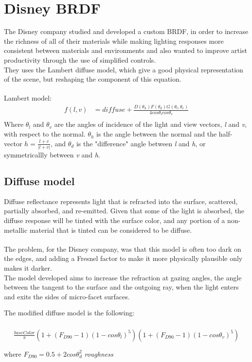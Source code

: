 \documentclass[11pt]{article}
\begin{document}
\section{Disney BRDF}
The Disney company studied and developed a custom BRDF, in order to increase the
richness of all of their materials while making lighting responses more consistent between materials and
environments and also wanted to improve artist productivity through the use of simplified controls.\\
They uses the Lambert diffuse model, which give a good physical representation of the scene, but reshaping the component of this equation.\\\\
Lambert model: 
\begin{align*}
 f(l,v) &= diffuse + \frac{D(\theta_h)F(\theta_d)G(\theta_l,\theta_v)}{4cos\theta_lcos\theta_v}\\
\end{align*}
Where $\theta_l$ and $\theta_v$ are the angles of incidence of the light and view vectors, \textit{l} and \textit{v}, with respect to the normal.
$\theta_h$ is the angle between the normal and the half-vector $h = \frac{l+v}{|l+v|} $, and $\theta_d$ is the "difference" angle between \textit{l} and \textit{h}, or symmetricallly between \textit{v} and \textit{h}.

\subsection{Diffuse model}
Diffuse reflectance represents light that is refracted into the surface, scattered, partially absorbed,
and re-emitted. Given that some of the light is absorbed, the diffuse response will be tinted with the
surface color, and any portion of a non-metallic material that is tinted can be considered to be diffuse.\\\\
The problem, for the Disney company, was that this model is often too dark on the edges, and adding a Fresnel factor to make it more physically plausible only makes it darker.\\
The model developed aims to increase the refraction at gazing angles, the angle between the tangent to the surface and the outgoing ray, when the light enters and exits the sides of micro-facet surfaces.

The modified diffuse model is the following:\\\\
\begin{align*}
 \frac{baseColor}{\pi} (1 + (F_{D90} - 1)(1 - cos\theta_l)^5)(1 + (F_{D90} -1)(1 - cos\theta_v)^5)\\\\
\end{align*}
where  $F_{D90} = 0.5 + 2cos\theta_d^2$ \textit{roughness}\\\\
\end{document}
